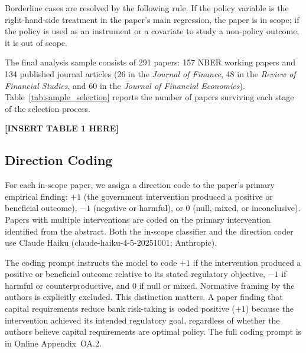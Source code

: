 \documentclass[12pt]{article}
\newcommand{\JF}{\textit{Journal of Finance}}
\newcommand{\RFS}{\textit{Review of Financial Studies}}
\newcommand{\JFE}{\textit{Journal of Financial Economics}}
\begin{document}
Borderline cases are resolved by the following rule.  If the policy
variable is the right-hand-side treatment in the paper's main
regression, the paper is in scope; if the policy is used as an instrument
or a covariate to study a non-policy outcome, it is out of scope.

The final analysis sample consists of 291 papers: 157 NBER working papers
and 134 published journal articles (26 in the \JF{}, 48 in the \RFS{}, and
60 in the \JFE{}).  Table~\ref{tab:sample_selection} reports the number of
papers surviving each stage of the selection process.


\begin{center}
\textbf{[INSERT TABLE 1 HERE]}
\end{center}

\subsection{Direction Coding}
\label{subsec:direction}

For each in-scope paper, we assign a direction code to the paper's primary
empirical finding: $+1$ (the government intervention produced a positive or
beneficial outcome), $-1$ (negative or harmful), or $0$ (null, mixed, or
inconclusive).  Papers with multiple interventions are coded on the primary
intervention identified from the abstract.  Both the in-scope classifier and the direction coder use
Claude Haiku (claude-haiku-4-5-20251001; Anthropic).

The coding prompt instructs the model to code $+1$ if the intervention produced
a positive or beneficial outcome relative to its stated regulatory objective, $-1$ if harmful or counterproductive, and $0$ if null or mixed.
Normative framing by the authors is explicitly excluded.  This distinction
matters.  A paper finding that capital requirements reduce bank risk-taking is
coded positive ($+1$) because the intervention achieved its intended regulatory
goal, regardless of whether the authors believe capital requirements are optimal
policy.  The full coding prompt is in Online Appendix~OA.2.
\end{document}
